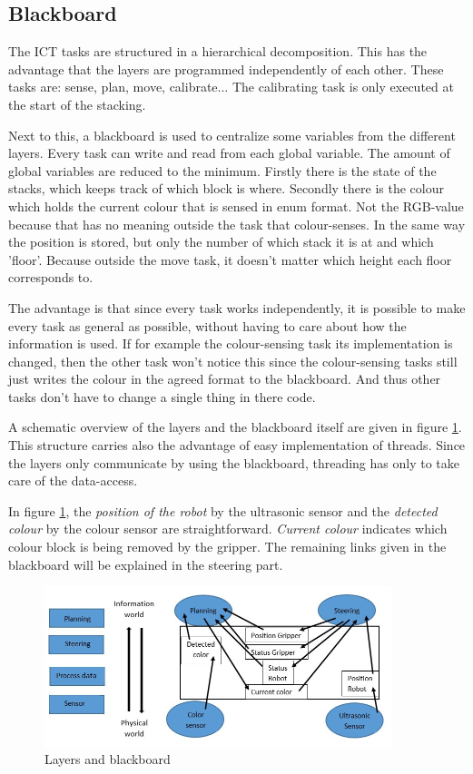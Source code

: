 \documentclass{article}
\begin{document}
	\subsection{Blackboard}
	\par The ICT tasks are structured in a hierarchical decomposition. This has the advantage that the layers are programmed independently of each other. These tasks are: sense, plan, move, calibrate... The calibrating task is only executed at the start of the stacking. 
	\par Next to this, a blackboard is used to centralize some variables from the different layers. Every task can write and read from each global variable. The amount of global variables are reduced to the minimum. Firstly there is the state of the stacks, which keeps track of which block is where. Secondly there is the colour which holds the current colour that is sensed in enum format. Not the RGB-value because that has no meaning outside the task that colour-senses. In the same way the position is stored, but only the number of which stack it is at and which 'floor'. Because outside the move task, it doesn't matter which height each floor corresponds to. 
	\par The advantage is that since every task works independently, it is possible to make every task as general as possible, without having to care about how the information is used. If for example the colour-sensing task its implementation is changed, then the other task won't notice this since the colour-sensing tasks still just writes the colour in the agreed format to the blackboard. And thus other tasks don't have to change a single thing in there code.
	\par A schematic overview of the layers and the blackboard itself are given in figure \ref{fig:layers}. This structure carries also the advantage of easy implementation of threads. Since the layers only communicate by using the blackboard, threading has only to take care of the data-access.
	\par In figure \ref{fig:layers}, the \textit{position of the robot} by the ultrasonic sensor and the \textit{detected colour} by the colour sensor are straightforward. \textit{Current colour} indicates which colour block is being removed by the gripper. The remaining links given in the blackboard will be explained in the steering part.
	
	\begin{figure}[H]
		\centering
		\includegraphics[keepaspectratio, width=0.9\textwidth]{Figures/Layers_Blackboard.JPG}
		\caption{Layers and blackboard}
		\label{fig:layers}
	\end{figure}
	
\end{document}
